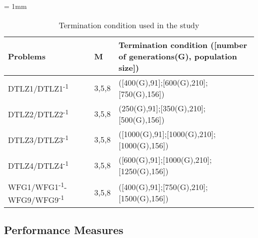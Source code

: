 \documentclass{sig-alternate}
\begin{document}
\begin{table}[!htb]
\begin{threeparttable}
\caption{Termination condition used in the study}
\label{tab:params_term_con}
\tabcolsep = 1mm
\begin{tabular}{p{2.5cm}p{.5cm}p{5cm}}
\hline
\textbf{Problems}&\textbf{M}& \textbf{Termination condition ([number of generations(G), population size])}\\
\hline
DTLZ1/DTLZ1\textsuperscript{-1}& 3,5,8 &([400(G),91];[600(G),210];[750(G),156])\\
DTLZ2/DTLZ2\textsuperscript{-1}& 3,5,8 &(250(G),91];[350(G),210];[500(G),156])\\
DTLZ3/DTLZ3\textsuperscript{-1}& 3,5,8 &([1000(G),91];[1000(G),210];[1000(G),156])\\
DTLZ4/DTLZ4\textsuperscript{-1}& 3,5,8 &([600(G),91];[1000(G),210];[1250(G),156])\\
WFG1/WFG1\textsuperscript{-1}-WFG9/WFG9\textsuperscript{-1}& 3,5,8 &([400(G),91];[750(G),210];[1500(G),156])\\
\hline
\end{tabular}
\end{threeparttable}
\end{table}

\subsection{Performance Measures}
\label{sec:perf}
\end{document}
